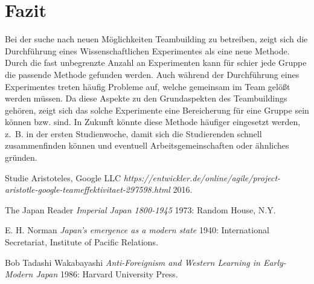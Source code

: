\documentclass[12pt]{scrartcl}
\begin{document}
\section{Fazit}
Bei der suche nach neuen Möglichkeiten Teambuilding zu betreiben, zeigt sich die Durchführung eines Wissenschaftlichen Experimentes als eine neue Methode. Durch die fast unbegrenzte Anzahl an Experimenten kann für schier jede Gruppe die passende Methode gefunden werden. Auch während der Durchführung eines Experimentes treten häufig Probleme auf, welche gemeinsam im Team gelößt werden müssen. Da diese Aspekte zu den Grundaspekten des Teambuildings gehören, zeigt sich das solche Experimente eine Bereicherung für eine Gruppe sein können bzw. sind. In Zukunft könnte diese Methode häufiger eingesetzt werden, z.~B. in der ersten Studienwoche, damit sich die Studierenden schnell zusammenfinden können und eventuell Arbeitsgemeinschaften oder ähnliches gründen.

\renewcommand{\bibname}{Literaturverzeichnis}
\begin{thebibliography}{1}

   Studie Aristoteles, Google LLC {\em https://entwickler.de/online/agile/project-aristotle-google-teameffektivitaet-297598.html}  2016.

    The Japan Reader {\em Imperial Japan 1800-1945} 1973:
  Random House, N.Y.

   E. H. Norman {\em Japan's emergence as a modern
  state} 1940: International Secretariat, Institute of Pacific
  Relations.

   Bob Tadashi Wakabayashi {\em Anti-Foreignism and Western
  Learning in Early-Modern Japan} 1986: Harvard University Press.

\end{thebibliography}
\end{document}
